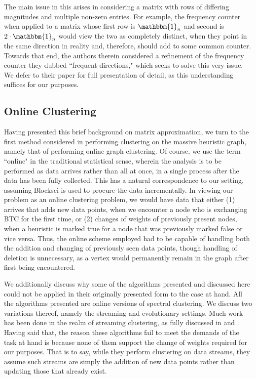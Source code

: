 \documentclass{article}
\begin{document}
The main issue in this arises in considering a matrix with rows of differing magnitudes and multiple non-zero entries. For example, the frequency counter when applied to a matrix whose first row is $\mathbbm{1}_n$ and second is $2\cdot\mathbbm{1}_n$ would view the two as completely distinct, when they point in the same direction in reality and, therefore, should add to some common counter. Towards that end, the authors therein considered a refinement of the frequency counter they dubbed ``frequent-directions," which seeks to solve this very issue. We defer to their paper for full presentation of detail, as this understanding suffices for our purposes.

\subsection{Online Clustering}
Having presented this brief background on matrix approximation, we turn to the first method considered in performing clustering on the massive heuristic graph, namely that of performing online graph clustering. Of course, we use the term ``online" in the traditional statistical sense, wherein the analysis is to be performed as data arrives rather than all at once, in a single process after the data has been fully collected. This has a natural correspondence to our setting, assuming Blocksci is used to procure the data incrementally. In viewing our problem as an online clustering problem, we would have data that either (1) arrives that adds new data points, when we encounter a node who is exchanging BTC for the first time, or (2) changes of weights of previously present nodes, when a heuristic is marked true for a node that was previously marked false or vice versa. Thus, the online scheme employed had to be capable of handling both the addition and changing of previously seen data points, though handling of deletion is unnecessary, as a vertex would permanently remain in the graph after first being encountered.

We additionally discuss why some of the algorithms presented and discussed here could not be applied in their originally presented form to the case at hand. All the algorithms presented are online versions of spectral clustering. We discuss two variations thereof, namely the streaming and evolutionary settings. Much work has been done in the realm of streaming clustering, as fully discussed in \cite{streaming} and \cite{eigen-update}. Having said that, the reason these algorithms fail to meet the demands of the task at hand is because none of them support the change of weights required for our purposes. That is to say, while they perform clustering on data streams, they assume such streams are simply the addition of new data points rather than updating those that already exist.
\end{document}
